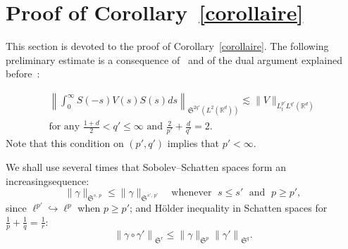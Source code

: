 \documentclass[10pt]{amsart}
\theoremstyle{definition}\newtheorem{defi}[theo]{Definition}\newtheorem{rema}[theo]{Remark}\newtheorem{exam}[theo]{Example}\newtheorem{exem}[theo]{Example}\newtheorem{nota}[theo]{Notation}
\newcommand{\R}{\mathbb{R}}
\newcommand{\frkS}{\mathfrak{S}}
\begin{document}
\section{Proof of Corollary~\ref{corollaire}} \label{sec:coro}

This section is devoted to the proof of Corollary~\ref{corollaire}. The following preliminary estimate is a consequence of~\cite[Theorem~8]{FS} and of the dual argument explained before~\cite[Theorem~2]{FLLS}:

\begin{multline} \label{bd:strichartzpotential}
\left\| \int_0^\infty S(-s)V(s)S(s)ds \right\|_{\frkS^{2q'}\left(L^2\left(\R^d\right)\right)}\lesssim \| V \|_{L^{p'}_tL^{q'}\left(\R^d\right)} \\
\text{for any } \frac{1+d}{2}<q'\leq \infty \text{ and } \frac{2}{p'}+\frac{d}{q'}=2.
\end{multline}
Note that this condition on $(p',q')$ implies that $p'<\infty$.

We shall use several times that Sobolev--Schatten spaces form an increasing\linebreak sequence:
\begin{equation} \label{bd:schattenincreasing}
\| \gamma \|_{\frkS^{s,\,p}}\leq \| \gamma \|_{\frkS^{s',\,p'}} \quad \text{whenever }\; s\leq s' \;\text{ and }\; p\geq p',
\end{equation}
since $\ell ^{p'} \hookrightarrow \ell ^p$ when $p \geq p'$; and H\"older inequality in Schatten spaces for $\tfrac{1}{p}+\tfrac{1}{q}=\tfrac{1}{r}$:
\begin{equation} \label{bd:holderschatten}
\left\| \gamma \circ \gamma' \right\|_{\frkS^{r}}\leq \| \gamma \|_{\frkS^p} \left\| \gamma' \right\|_{\frkS^{q}}.
\end{equation}
\end{document}

